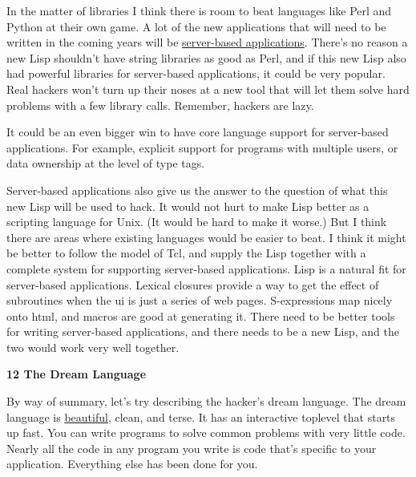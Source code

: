 In
                  the matter of libraries I think there is room to beat
                  languages like Perl and Python at their own game. A lot of the
                  new applications that will need to be written in the coming
                  years will be
                  \href{http://www.paulgraham.com/road.html}{server-based applications}. There's no
                  reason a new Lisp shouldn't have string libraries as good as
                  Perl, and if this new Lisp also had powerful libraries for
                  server-based applications, it could be very popular. Real
                  hackers won't turn up their noses at a new tool that will let
                  them solve hard problems with a few library calls. Remember,
                  hackers are lazy.

It could be an even bigger win to
                  have core language support for server-based applications. For
                  example, explicit support for programs with multiple users, or
                  data ownership at the level of type tags.

Server-based
                  applications also give us the answer to the question of what
                  this new Lisp will be used to hack. It would not hurt to make
                  Lisp better as a scripting language for Unix. (It would be
                  hard to make it worse.) But I think there are areas where
                  existing languages would be easier to beat. I think it might
                  be better to follow the model of Tcl, and supply the Lisp
                  together with a complete system for supporting server-based
                  applications. Lisp is a natural fit for server-based
                  applications. Lexical closures provide a way to get the effect
                  of subroutines when the ui is just a series of web pages.
                  S-expressions map nicely onto html, and macros are good at
                  generating it. There need to be better tools for writing
                  server-based applications, and there needs to be a new Lisp,
                  and the two would work very well together.

\textbf{12 The Dream Language}

By way of summary, let's try describing the
                  hacker's dream language. The dream language is
                  \href{http://www.paulgraham.com/taste.html}{beautiful}, clean, and terse. It has
                  an interactive toplevel that starts up fast. You can write
                  programs to solve common problems with very little code.
                  Nearly all the code in any program you write is code that's
                  specific to your application. Everything else has been done
                  for you.

